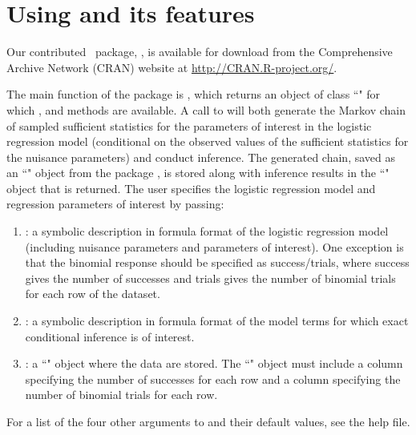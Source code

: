 \documentclass[article, shortnames]{jss}
\begin{document}
\section[Using elrm and its features]{Using  and its features} \label{ueaif}

Our contributed \ package, , is available
for download from the Comprehensive  Archive Network (CRAN)
website at \url{http://CRAN.R-project.org/}.

The main function of the  package is ,
which returns an object of class ``" for which
,  and  methods are
available. A call to  will both generate the Markov
chain of sampled sufficient statistics for the parameters of
interest in the logistic regression model (conditional on the
observed values of the sufficient statistics for the nuisance
parameters) and conduct inference. The generated chain, saved as
an ``" object from the  package \citep{coda},
is stored along with inference results in the ``" object that is
returned. The user specifies the logistic regression model and
regression parameters of interest by passing:

\begin{enumerate}

\item {}: a symbolic description in
 formula format of the logistic regression model
(including nuisance parameters and parameters of interest). One
exception is that the binomial response should be specified as
success/trials, where success gives the number of successes and
trials gives the number of binomial trials for each row of the
dataset.

\item {}: a symbolic description in
 formula format of the model terms for which exact
conditional inference is of interest.

\item {}: a ``" object where the data
are stored. The ``" object must include a column
specifying the number of successes for each row and a column
specifying the number of binomial trials for each row.

\end{enumerate}
For a list of the four other arguments to  and their
default values, see the help file.
\end{document}
